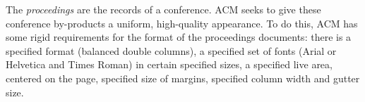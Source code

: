 \documentclass[sigplan, anonymous, review]{acmart}
\begin{document}
The \textit{proceedings} are the records of a conference.  ACM seeks to give
these conference by-products a uniform, high-quality appearance.  To do this,
ACM has some rigid requirements for the format of the proceedings documents:
there is a specified format (balanced double columns), a specified set of fonts
(Arial or Helvetica and Times Roman) in certain specified sizes, a specified
live area, centered on the page, specified size of margins, specified column
width and gutter size.



\end{document}

